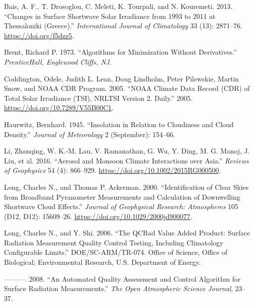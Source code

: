 \documentclass[
  preprint, 3p, authoryear]{article}
\newlength{\cslhangindent}
\newlength{\cslentryspacingunit} %
\newenvironment{CSLReferences}[2] %
 {%
  \setlength{\parindent}{0pt}
  \ifodd #1
  \let\oldpar\par
  \def\par{\hangindent=\cslhangindent\oldpar}
  \fi
  \setlength{\parskip}{#2\cslentryspacingunit}
 }%
 {}
\begin{document}
\hypertarget{refs}{}
\begin{CSLReferences}{1}{0}
\leavevmode{}%
Bais, A. F., T. Drosoglou, C. Meleti, K. Tourpali, and N. Kouremeti. 2013. {``Changes in Surface Shortwave Solar Irradiance from 1993 to 2011 at Thessaloniki (Greece).''} \emph{International Journal of Climatology} 33 (13): 2871--76. \url{https://doi.org/f5dzz5}.

\leavevmode{}%
Brent, Richard P. 1973. {``Algorithms for Minimization Without Derivatives.''} \emph{PrenticeHall, Englewood Cliffs, NJ}.

\leavevmode{}%
Coddington, Odele, Judith L. Lean, Doug Lindholm, Peter Pilewskie, Martin Snow, and NOAA CDR Program. 2005. {``{NOAA} Climate Data Record ({CDR}) of Total Solar Irradiance ({TSI}), {NRLTSI} Version 2. {D}aily.''} 2005. \url{https://doi.org/10.7289/V55B00C1}.

\leavevmode{}%
Haurwitz, Bernhard. 1945. {``Insolation in {Relation} to {Cloudiness} and {Cloud} {Density}.''} \emph{Journal of Meteorology} 2 (September): 154--66.

\leavevmode{}%
Li, Zhanqing, W. K.‐M. Lau, V. Ramanathan, G. Wu, Y. Ding, M. G. Manoj, J. Liu, et al. 2016. {``Aerosol and Monsoon Climate Interactions over Asia.''} \emph{Reviews of Geophysics} 54 (4): 866--929. \url{https://doi.org/10.1002/2015RG000500}.

\leavevmode{}%
Long, Charles N., and Thomas P. Ackerman. 2000. {``Identification of Clear Skies from Broadband Pyranometer Measurements and Calculation of Downwelling Shortwave Cloud Effects.''} \emph{Journal of Geophysical Research: Atmospheres} 105 (D12, D12): 15609--26. \url{https://doi.org/10.1029/2000jd900077}.

\leavevmode{}%
Long, Charles N., and Y. Shi. 2006. {``The QCRad Value Added Product: Surface Radiation Measurement Quality Control Testing, Including Climatology Configurable Limits.''} DOE/SC-ARM/TR-074. Office of Science, Office of Biological; Environmental Research, U.S. Department of Energy.

\leavevmode{}%
---------. 2008. {``An Automated Quality Assessment and Control Algorithm for Surface Radiation Measurements.''} \emph{The Open Atmospheric Science Journal}, 23--37.


\end{CSLReferences}
\end{document}
